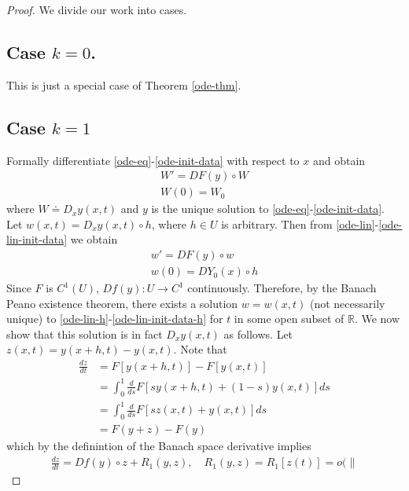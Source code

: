 \documentclass[12pt,reqno]{amsart}
\numberwithin{equation}{section}  %
\numberwithin{figure}{section}
\newcommand{\rr}{\mathbb{R}}
\theoremstyle{plain}
\theoremstyle{definition}
\theoremstyle{remark}
\begin{document}
\begin{proof}
  We divide our work into cases.
  \subsection{Case $k = 0$.} 
  \label{ssec:case-0}
  This is just a special case of Theorem \ref{ode-thm}.
    \subsection{Case $k=1$} 
  \label{ssec:case-k}
Formally differentiate
\eqref{ode-eq}-\eqref{ode-init-data} with respect to $x$ and obtain
%
%
%
\begin{gather}
  W' = DF(y) \circ W
  \label{ode-lin}
  \\
  W(0) = W_{0} 
  \label{ode-lin-init-data}
\end{gather}
%
%
where $W \doteq D_{x} y(x,t)$ and $y$ is the unique solution to
\eqref{ode-eq}-\eqref{ode-init-data}. Let $w(x,t) = D_{x}y(x,t) \circ h$, where $h \in U$ is
arbitrary. Then
from \eqref{ode-lin}-\eqref{ode-lin-init-data} we
obtain
%
%
\begin{gather}
  w' = DF(y) \circ w 
  \label{ode-lin-h}
  \\
  w(0) = DY_{0}(x) \circ h
  \label{ode-lin-init-data-h}
\end{gather}
%
%
Since $F$ is $C^{1}(U)$, $Df(y): U \to C^{1}$ continuously. Therefore, by the Banach Peano
existence theorem, there exists a solution $w = w(x,t)$ (not necessarily unique) to
\eqref{ode-lin-h}-\eqref{ode-lin-init-data-h} for $t$ in some open subset of
$\rr$. We now show that this solution is in fact $D_{x} y(x,t)$ as follows. Let
$z(x,t) = y(x + h, t) - y(x,t)$. Note that
%
%
\begin{equation}
  \label{uhh}
\begin{split}
\frac{dz}{dt} 
& = F\left[ y(x + h, t) \right] - F\left[ y(x,t) \right]
\\
& = \int_{0}^{1} \frac{d}{ds} F\left[ sy(x+h, t) + (1-s)y(x,t) \right]ds
\\
& = \int_{0}^{1} \frac{d}{ds} F\left[ sz(x,t) + y(x,t) \right] ds
\\
& = F(y+z) - F(y)
\end{split}
\end{equation}
%
%
which by the definintion of the Banach space derivative implies
%
%
\begin{equation*}
\begin{split}
  \frac{dz}{dt} = Df(y) \circ z + R_{1}(y,z), \quad R_{1}(y,z) = R_{1}[z(t)] = o(\|

\end{split}
\end{equation*}
\end{proof}
\end{document}
